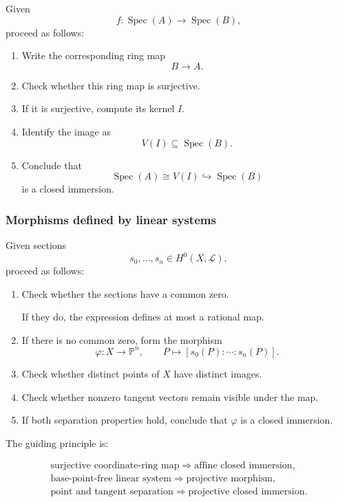 \documentclass[12pt,a4paper]{article}
\theoremstyle{notespace}
\begin{document}
Given
\[
f:\operatorname{Spec}(A)\longrightarrow \operatorname{Spec}(B),
\]
proceed as follows:
\begin{enumerate}[label=\textup{Step \arabic*.}]
	\item Write the corresponding ring map
	\[
	B\longrightarrow A.
	\]
	\item Check whether this ring map is surjective.
	\item If it is surjective, compute its kernel \(I\).
	\item Identify the image as
	\[
	V(I)\subseteq \operatorname{Spec}(B).
	\]
	\item Conclude that
	\[
	\operatorname{Spec}(A)\cong V(I)\hookrightarrow \operatorname{Spec}(B)
	\]
	is a closed immersion.
\end{enumerate}

\subsubsection{Morphisms defined by linear systems}

Given sections
\[
s_{0},\ldots,s_{n}\in H^{0}(X,\mathcal{L}),
\]
proceed as follows:
\begin{enumerate}[label=\textup{Step \arabic*.}]
	\item Check whether the sections have a common zero.
	
	If they do, the expression defines at most a rational map.
	
	\item If there is no common zero, form the morphism
	\[
	\varphi:X\longrightarrow \mathbb{P}^{n},
	\qquad
	P\longmapsto [s_{0}(P):\cdots:s_{n}(P)].
	\]
	
	\item Check whether distinct points of \(X\) have distinct images.
	
	\item Check whether nonzero tangent vectors remain visible under the map.
	
	\item If both separation properties hold, conclude that \(\varphi\) is a closed immersion.
\end{enumerate}

The guiding principle is:

\[
\boxed{
	\begin{array}{c}
		\text{surjective coordinate-ring map}
		\Longrightarrow
		\text{affine closed immersion},
		\\[6pt]
		\text{base-point-free linear system}
		\Longrightarrow
		\text{projective morphism},
		\\[6pt]
		\text{point and tangent separation}
		\Longrightarrow
		\text{projective closed immersion}.
	\end{array}
}
\]
\end{document}
